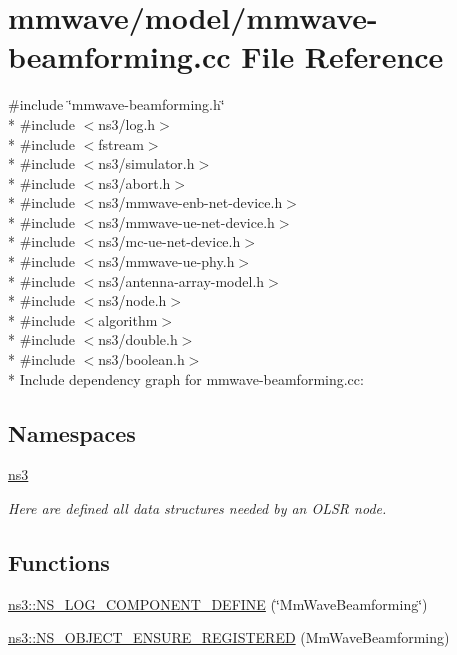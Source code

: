 \hypertarget{mmwave-beamforming_8cc}{}\section{mmwave/model/mmwave-\/beamforming.cc File Reference}
\label{mmwave-beamforming_8cc}
{\ttfamily \#include \char`\"{}mmwave-\/beamforming.\+h\char`\"{}}\\*
{\ttfamily \#include $<$ns3/log.\+h$>$}\\*
{\ttfamily \#include $<$fstream$>$}\\*
{\ttfamily \#include $<$ns3/simulator.\+h$>$}\\*
{\ttfamily \#include $<$ns3/abort.\+h$>$}\\*
{\ttfamily \#include $<$ns3/mmwave-\/enb-\/net-\/device.\+h$>$}\\*
{\ttfamily \#include $<$ns3/mmwave-\/ue-\/net-\/device.\+h$>$}\\*
{\ttfamily \#include $<$ns3/mc-\/ue-\/net-\/device.\+h$>$}\\*
{\ttfamily \#include $<$ns3/mmwave-\/ue-\/phy.\+h$>$}\\*
{\ttfamily \#include $<$ns3/antenna-\/array-\/model.\+h$>$}\\*
{\ttfamily \#include $<$ns3/node.\+h$>$}\\*
{\ttfamily \#include $<$algorithm$>$}\\*
{\ttfamily \#include $<$ns3/double.\+h$>$}\\*
{\ttfamily \#include $<$ns3/boolean.\+h$>$}\\*
Include dependency graph for mmwave-\/beamforming.cc\+:
\subsection*{Namespaces}
\begin{DoxyCompactItemize}
\item 
 \hyperlink{namespacens3}{ns3}
\begin{DoxyCompactList}\small\item\em Here are defined all data structures needed by an O\+L\+SR node. \end{DoxyCompactList}\end{DoxyCompactItemize}
\subsection*{Functions}
\begin{DoxyCompactItemize}
\item 
\hyperlink{namespacens3_a404e554b616c795a508dc18695dde257}{ns3\+::\+N\+S\+\_\+\+L\+O\+G\+\_\+\+C\+O\+M\+P\+O\+N\+E\+N\+T\+\_\+\+D\+E\+F\+I\+NE} (\char`\"{}Mm\+Wave\+Beamforming\char`\"{})
\item 
\hyperlink{namespacens3_a92e8aca43ac9fb1ebdfc93ed0a740519}{ns3\+::\+N\+S\+\_\+\+O\+B\+J\+E\+C\+T\+\_\+\+E\+N\+S\+U\+R\+E\+\_\+\+R\+E\+G\+I\+S\+T\+E\+R\+ED} (Mm\+Wave\+Beamforming)
\end{DoxyCompactItemize}
